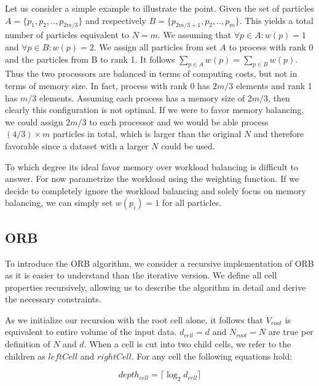 \documentclass[]{article}
\begin{document}
Let us consider a simple example to illustrate the point. Given the set of particles $A = \{p_1, p_2, .., p_{2m/3}\}$ and respectively $B = \{p_{2m/3 + 1}, p_2, .., p_{m}\}$. This yields a total number of particles equivalent to $N = m$. We assuming that $\forall p \in A : w(p) = 1$ and $\forall p \in B : w(p) = 2$. 
We assign all particles from set $A$ to process with rank 0 and the particles from B to rank 1. It follows $\sum_{p\in A} w(p) = \sum_{p\in B} w(p)$. Thus the two processors are balanced in terms of computing costs, but not in terms of memory size. In fact, process with rank 0 has $2m/3$ elements and rank 1 has $m/3$ elements. Assuming each process has a memory size of $2m/3$, then clearly this configuration is not optimal. If we were to favor memory balancing, we could assign $2m/3$ to each processor and we would be able process $(4/3) \times m$ particles in total, which is larger than the original $N$ and therefore favorable since a dataset with a larger $N$ could be used.

To which degree its ideal favor memory over workload balancing is difficult to answer. For now parametrize the workload using the weighting function. If we decide to completely ignore the workload balancing and solely focus on memory balancing, we can simply set $w(p_i) = 1$ for all particles.

\subsection{ORB}


To introduce the ORB algorithm, we consider a recursive implementation of ORB as it is easier to understand than the iterative version. We define all cell properties recursively, allowing us to describe the algorithm in detail and derive the necessary constraints.

As we initialize our recursion with the root cell alone, it follows that $V_{root}$ is equivalent to entire volume of the input data. $d_{cell} = d$ and $N_{root} = N$ are true per definition of $N$ and $d$. 
When a cell is cut into two child cells, we refer to the children as $leftCell$ and $rightCell$. For any cell the following equations hold:

\begin{center}
	\begin{equation}
		depth_{cell} = \lceil \log_2{d_{cell}} \rceil 
	\end{equation}
\end{center}
\end{document}
